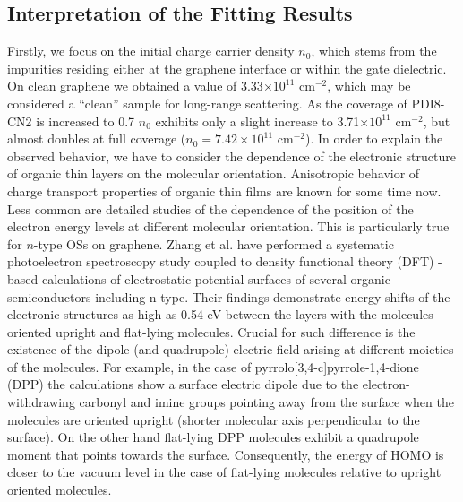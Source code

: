 \documentclass[preprint,aip,jap]{revtex4-2}
\begin{document}
\subsection{Interpretation of the Fitting Results}
\label{sec:interp}

Firstly, we focus on the initial charge carrier density $n_0$, which stems from the impurities residing either at the graphene interface or within the gate dielectric. On clean graphene we obtained a value of 3.33$\times 10^{11}$ cm$^{-2}$, which may be considered a ``clean'' sample for long-range scattering.  As the coverage of PDI8-CN2 is increased to 0.7 $n_0$ exhibits only a slight increase to 3.71$\times 10^{11}$ cm$^{-2}$, but almost doubles at full coverage ($n_{0}=7.42\times 10^{11}$ cm$^{-2}$).
In order to explain the observed behavior, we have to consider the dependence of the electronic structure of organic thin layers on the molecular orientation.  Anisotropic behavior of charge transport properties of organic thin films are known for some time now\cite{sundar-2004}. Less common are detailed studies of the dependence of the position of the electron energy levels at different molecular orientation. This is particularly true for $n$-type OSs on graphene. Zhang et al.\cite{zhang-2016d} have performed a systematic photoelectron spectroscopy study coupled to density functional theory (DFT) -based calculations of electrostatic potential surfaces of several organic semiconductors including n-type. Their findings demonstrate energy shifts of the electronic structures as high as 0.54 eV between the layers with the molecules oriented upright and flat-lying molecules.  Crucial for such difference is the existence of the dipole (and quadrupole) electric field arising at different moieties of the molecules. For example, in the case of pyrrolo[3,4-c]pyrrole-1,4-dione (DPP)  the calculations show a surface electric dipole due to the electron-withdrawing carbonyl and imine groups pointing  away from the surface when the molecules are oriented upright (shorter molecular axis perpendicular to the surface). On the other hand flat-lying DPP molecules exhibit a quadrupole moment that points towards the surface. Consequently, the energy of HOMO is closer to the vacuum level in the case of flat-lying molecules relative to upright oriented molecules.  
\end{document}
